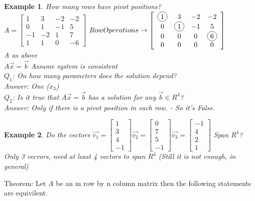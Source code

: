 \documentclass[a4paper,12pt,openany]{book}
\newcommand*\circled[1]{\tikz[baseline=(char.base)]{
            \node[shape=circle,draw,inner sep=2pt] (char) {#1};}}
\theoremstyle{defn}
\theoremstyle{expl}
\newtheorem{expl}{Example}[section]
\begin{document}
\begin{expl}
\textup{
How many rows have pivot positions?\\
$A = \left[\begin{array}{cccc}1&3&-2&-2\\0&1&-1&5\\-1&-2&1&7\\1&1&0&-6\end{array}\right]$
$Row Operations \rightarrow \left[\begin{array}{cccc}\circled{1}&3&-2&-2\\0&\circled{1}&-1&5\\0&0&0&\circled{6}\\0&0&0&0\end{array}\right]$\\
A as above\\ $A\vec{x}=\vec{b}$ Assume system is consistent\\
$Q_1$: On how many parameters does the solution depend?\\
Answer: One ($x_3$)\\
$Q_2$: Is it true that $A\vec{x}=\vec{b}$ has a solution for any $\vec{b} \in R^4$?\\
Answer: Only if there is a pivot position in each row. - So it's False.
}\end{expl}
\begin{expl}
\textup{
Do the vectors $\vec{v_1}=\left[\begin{array}{c}1\\3\\4\\-1\end{array}\right] \vec{v_2}=\left[\begin{array}{c}0\\7\\5\\-1\end{array}\right] \vec{v_3}=\left[\begin{array}{c}-1\\4\\2\\1\end{array}\right]$ Span $R^4$?\\
Only 3 vecrors, need at least 4 vectors to span $R^4$ (Still it is not enough, in general)\\
}\end{expl}
Theorem: Let $A$ be an m row by n column matrix then the following statements are equivilent.\\
\end{document}
